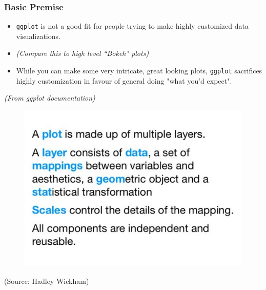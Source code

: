 \documentclass{beamer}
\begin{document}
\begin{frame}[fragile]
	\Large
\frametitle{Basic Premise}
	\begin{itemize}
		\item \texttt{ggplot} is not a good fit for people trying to make highly customized data visualizations. 
		\item \textit{(Compare this to high level ``Bokeh" plots)}
		\item While you can make some very intricate, great looking plots, \texttt{ggplot} sacrifices highly customization in favour of general doing "what you'd expect".
	\end{itemize}
\textit{(From ggplot documentation)}	
\end{frame}

\begin{frame}[fragile]
	\begin{figure}
		\centering
		\includegraphics[width=1.1\linewidth]{ggplot2-info}
	\end{figure}
	(Source: Hadley Wickham)
\end{frame}
\end{document}
